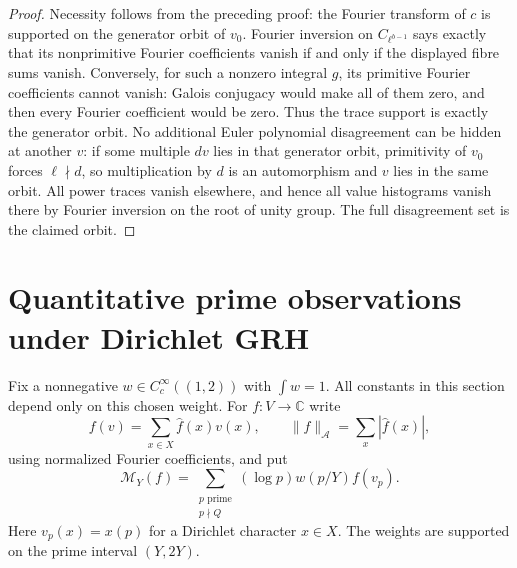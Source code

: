\documentclass[11pt]{article}
\theoremstyle{definition}
\theoremstyle{remark}
\newcommand{\C}{\mathbb C}
\begin{document}
\begin{proof}
Necessity follows from the preceding proof: the Fourier transform of
$c$ is supported on the generator orbit of $v_0$.  Fourier inversion
on $C_{\ell^{b-1}}$ says exactly that its nonprimitive Fourier
coefficients vanish if and only if the displayed fibre sums vanish.
Conversely, for such a nonzero integral $g$, its primitive Fourier
coefficients cannot vanish: Galois conjugacy would make all of them
zero, and then every Fourier coefficient would be zero.  Thus the
trace support is exactly the generator orbit.  No additional Euler
polynomial disagreement can be hidden at another $v$: if some multiple
$dv$ lies in that generator orbit, primitivity of $v_0$ forces
$\ell\nmid d$, so multiplication by $d$ is an automorphism and $v$
lies in the same orbit.  All power traces vanish elsewhere, and hence
all value histograms vanish there by Fourier inversion on the root
of unity group.  The full disagreement set is the claimed orbit.
\end{proof}



\section{Quantitative prime observations under Dirichlet GRH}\label{sec:prime-windows}
Fix a nonnegative $w\in C_c^\infty((1,2))$ with $\int w=1$. All constants in this section depend only on this chosen weight. For $f:V\to\C$ write
\[
 f(v)=\sum_{x\in X}\widehat f(x)v(x),\qquad
 \|f\|_{\mathcal A}=\sum_x|\widehat f(x)|,
\]
using normalized Fourier coefficients, and put
\[
 \mathcal M_Y(f)=\sum_{\substack{p\text{ prime}\\p\nmid Q}}(\log p)w(p/Y)f(v_p).
\]
Here $v_p(x)=x(p)$ for a Dirichlet character $x\in X$. The weights are supported on the prime interval $(Y,2Y)$.
\end{document}
